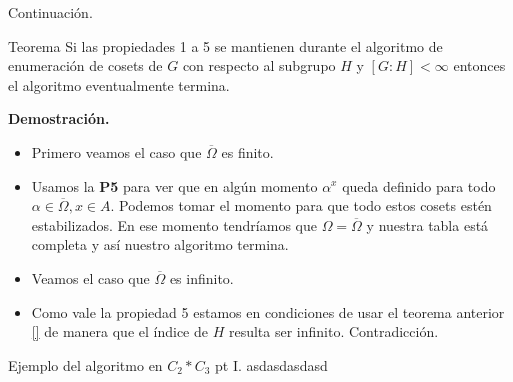 \documentclass[aspectratio=169, 9pt]{beamer}
\newcommand{\ol}{\overline}
\begin{document}
\begin{frame}[fragile]{Continuación.}
	\begin{alertblock}{Teorema}
		Si las propiedades 1 a 5 se mantienen durante el algoritmo de enumeración de cosets de $G$ con respecto al subgrupo $H$ y $[G:H] < \infty$ entonces el algoritmo eventualmente termina.
	\end{alertblock}
	\pause
	
	
	\textbf{Demostración.} 
	\begin{itemize}
		\item Primero veamos el caso que $\ol \Omega$ es finito.
		\pause
		\item Usamos la \textbf{P5} para ver que en algún momento $\alpha^x$ queda definido para todo $\alpha \in \ol\Omega, x \in A$.
		\pause 
		Podemos tomar el momento para que todo estos cosets estén estabilizados.
		\pause
		En ese momento tendríamos que $\Omega = \ol \Omega$ y nuestra tabla está completa y así nuestro algoritmo termina.
		\item Veamos el caso que $\ol \Omega$ es infinito.
		\pause
		\item Como vale la propiedad 5 estamos en condiciones de usar el teorema anterior \ref{} de manera que el índice de $H$ resulta ser infinito.
		Contradicción.
	\end{itemize}
\end{frame}

\begin{frame}[fragile]{Ejemplo del algoritmo en $C_2 \ast C_3$ pt I.}
asdasdasdasd
\end{frame}
\end{document}
